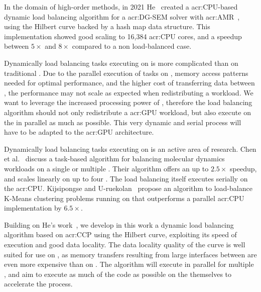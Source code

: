 In the domain of high-order methods, in 2021 He~\cite{He2021} created a \acrshort{acr:CPU}-based
dynamic load balancing algorithm for a \acrshort{acr:DG-SEM} solver with
\acrshort{acr:AMR}~\cite{He2021}, using the Hilbert curve backed by a hash map data structure. This
implementation showed good scaling to 16,384 \acrshort{acr:CPU} cores, and a speedup between \(5
\times \) and \(8 \times \) compared to a non load-balanced case.

Dynamically load balancing tasks executing on  is more complicated than on
traditional . Due to the parallel execution of tasks on ,
memory access patterns needed for optimal performance, and the higher cost of transferring data
between , the performance may not scale as expected when redistributing a
workload. We want to leverage the increased processing power of , therefore the
load balancing algorithm should not only redistribute a \acrshort{acr:GPU} workload, but also
execute on the  in parallel as much as possible. This very dynamic and serial
process will have to be adapted to the \acrshort{acr:GPU} architecture.

Dynamically load balancing tasks executing on  is an active area of research.
Chen et al.~\cite{Chen2010} discuss a task-based algorithm for balancing molecular dynamics
workloads on a single or multiple . Their algorithm offers an up to \(2.5 \times
\) speedup, and scales linearly on up to four . The load balancing itself
executes serially on the \acrshort{acr:CPU}. Kijsipongse and U-ruekolan~\cite{Kijsipongse2012}
propose an algorithm to load-balance K-Means clustering problems running on 
that outperforms a parallel \acrshort{acr:CPU} implementation by \(6.5 \times \).

Building on He's work~\cite{He2021}, we develop in this work a dynamic load balancing algorithm
based on \acrshort{acr:CCP} using the Hilbert curve, exploiting its speed of execution and good data
locality. The data locality quality of the curve is well suited for use on , as
memory transfers resulting from large interfaces between  are even more
expensive than on . The algorithm will execute in parallel for multiple
, and aim to execute as much of the code as possible on the 
themselves to accelerate the process.
